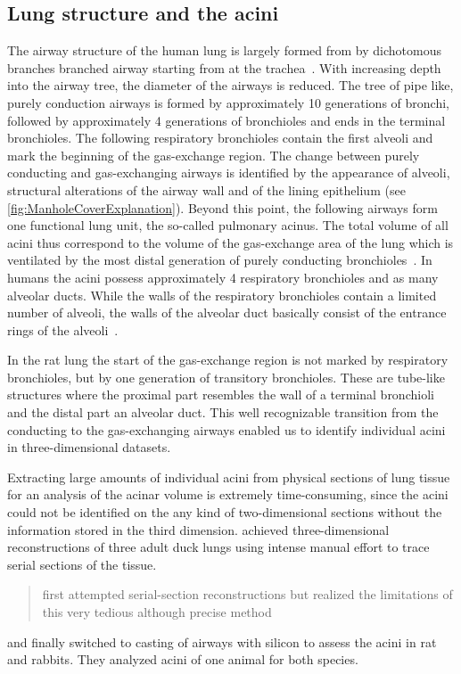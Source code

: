 \documentclass[a4paper,DIV=calc,abstract,english]{scrartcl}
\begin{document}
\subsection{Lung structure and the acini}
The airway structure of the human lung is largely formed from by dichotomous branches branched airway starting from at the trachea~\citep{Weibel1991}.
With increasing depth into the airway tree, the diameter of the airways is reduced.
The tree of pipe like, purely conduction airways is formed by approximately 10 generations of bronchi, followed by approximately 4 generations of bronchioles and ends in the terminal bronchioles.
The following respiratory bronchioles contain the first alveoli and mark the beginning of the gas-exchange region.
The change between purely conducting and gas-exchanging airways is identified by the appearance of alveoli, structural alterations of the airway wall and of the lining epithelium (see \autoref{fig:ManholeCoverExplanation}).
Beyond this point, the following airways form one functional lung unit, the so-called pulmonary acinus.
The total volume of all acini thus correspond to the volume of the gas-exchange area of the lung which is ventilated by the most distal generation of purely conducting bronchioles~\citep{Rodriguez1987}.
In humans the acini possess approximately 4 respiratory bronchioles and as many alveolar ducts.
While the walls of the respiratory bronchioles contain a limited number of alveoli, the walls of the alveolar duct basically consist of the entrance rings of the alveoli~\citep{Schittny2007a}.

In the rat lung the start of the gas-exchange region is not marked by respiratory bronchioles, but by one generation of transitory bronchioles.
These are tube-like structures where the proximal part resembles the wall of a terminal bronchioli and the distal part an alveolar duct.
This well recognizable transition from the conducting to the gas-exchanging airways enabled us to identify individual acini in three-dimensional datasets.

Extracting large amounts of individual acini from physical sections of lung tissue for an analysis of the acinar volume is extremely time-consuming, since the acini could not be identified on the any kind of two-dimensional sections without the information stored in the third dimension.
\citet{Woodward2005} achieved three-dimensional reconstructions of three adult duck lungs using intense manual effort to trace serial sections of the tissue.
\citet{Rodriguez1987} \blockquote{first attempted serial-section reconstructions but realized the limitations of this very tedious although precise method} and finally switched to casting of airways with silicon to assess the acini in rat and rabbits.
They analyzed acini of one animal for both species.
\end{document}
